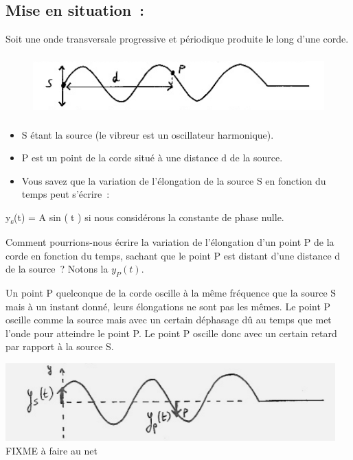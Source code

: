 \subsection{Mise en situation~: }

Soit une onde transversale progressive et périodique produite le long
d'une corde.
\begin{figure}
\centering
\includegraphics[width=13.645cm,height=2.305cm]{Pictures/10000001000003340000008AA6B62AF7250A4682.png}
\caption{}
\end{figure}

\begin{itemize}
\item
  S étant la source (le vibreur est un oscillateur harmonique).
\item
  P est un point de la corde situé à une distance d de la source.
\item
  Vous savez que la variation de l'élongation de la source S en fonction
  du temps peut s'écrire~:
\end{itemize}

y\textsubscript{s}(t) = A sin (t ) si nous considérons la constante de
phase nulle.

Comment pourrions-nous écrire la variation de l'élongation d'un point
  P de la corde en fonction du temps, sachant que le point P est distant
  d'une distance d de la source~? Notons la $y_P(t)$.

Un point P quelconque de la corde oscille à la même fréquence que la
source S mais à un instant donné, leurs élongations ne sont pas les
mêmes. Le point P oscille comme la source mais avec un certain déphasage
dû au temps que met l'onde pour atteindre le point P. Le point P oscille
donc avec un certain retard par rapport à la source S.

\includegraphics[width=12.696cm,height=2.99cm]{Pictures/100000010000034A000000C6944A1FC3E4803CD5.png}
FIXME à faire au net

